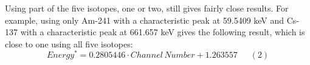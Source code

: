 Using part of the five isotopes, one or two, still gives fairly close results. For example, using only Am-241 with a characteristic peak at 59.5409 keV and Cs-137 with a characteristic peak at 661.657 keV gives the following result, which is close to one using all five isotopes:
\[{Energy^*}=0.2805446 \cdot Channel\,Number+1.263557\,\,\,\,\,\,\,\,\,(2)\]
